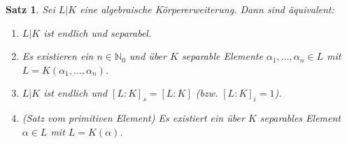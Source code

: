 \documentclass[a4paper, twoside, 11pt, ngerman]{report}
\newcommand{\NN}{\mathds N}
\theoremstyle{definistyle}
\newtheorem{satz}{Satz}[section]
\theoremstyle{remark}
\begin{document}
\begin{satz}\label{satz:char_endl_separabel}
Sei $L|K$ eine algebraische Körpererweiterung. Dann sind äquivalent:
\begin{enumerate}
    \item[(i)] $L|K$ ist endlich und separabel.
    \item[(ii)] Es existieren ein $n \in \NN_0$ und über $K$ separable Elemente $\alpha_1, \dots, \alpha_n \in L$ mit $L = K(\alpha_1, \dots, \alpha_n)$.
    \item[(iii)] $L|K$ ist endlich und $[L : K]_s = [L : K]$ (bzw. $[L : K]_i = 1$).
    \item[(iv)] (Satz vom primitiven Element) Es existiert ein über $K$ separables Element $\alpha \in L$ mit $L = K(\alpha)$.
\end{enumerate}
\end{satz}
\end{document}
